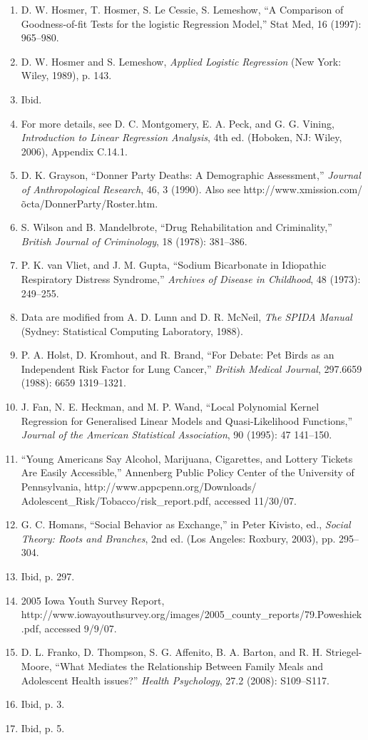 \documentclass[
]{report}
\begin{document}
\begin{enumerate}
\item D. W. Hosmer, T. Hosmer, S. Le Cessie, S. Lemeshow, “A Comparison of Goodness-of-fit Tests for the logistic Regression Model,” Stat Med, 16 (1997): 965–980.
\item D. W. Hosmer and S. Lemeshow, \textit{Applied Logistic Regression} (New York: Wiley, 1989), p. 143.
\item Ibid.
\item For more details, see D. C. Montgomery, E. A. Peck, and G. G. Vining, \textit{Introduction to Linear Regression Analysis}, 4th ed. (Hoboken, NJ: Wiley, 2006), Appendix C.14.1.
\item D. K. Grayson, “Donner Party Deaths: A Demographic Assessment,” \textit{Journal of Anthropological Research}, 46, 3 (1990). Also see http://www.xmission.com/\~octa/DonnerParty/Roster.htm.
\item S. Wilson and B. Mandelbrote, “Drug Rehabilitation and Criminality,” \textit{British Journal of Criminology}, 18 (1978): 381–386.
\item P. K. van Vliet, and J. M. Gupta, “Sodium Bicarbonate in Idiopathic Respiratory Distress Syndrome,” \textit{Archives of Disease in Childhood}, 48 (1973): 249–255.
\item Data are modified from A. D. Lunn and D. R. McNeil, \textit{The SPIDA Manual} (Sydney: Statistical Computing Laboratory, 1988).
\item P. A. Holst, D. Kromhout, and R. Brand, “For Debate: Pet Birds as an Independent Risk Factor for Lung Cancer,” \textit{British Medical Journal}, 297.6659 (1988): 6659 1319–1321.
\item J. Fan, N. E. Heckman, and M. P. Wand, “Local Polynomial Kernel Regression for Generalised Linear Models and Quasi-Likelihood Functions,” \textit{Journal of the American Statistical Association}, 90 (1995): 47 141–150.
\item “Young Americans Say Alcohol, Marijuana, Cigarettes, and Lottery Tickets Are Easily Accessible,” Annenberg Public Policy Center of the University of Pennsylvania, http://www.appcpenn.org/Downloads/
Adolescent\_Risk/Tobacco/risk\_report.pdf, accessed 11/30/07.
\item G. C. Homans, “Social Behavior as Exchange,” in Peter Kivisto, ed., \textit{Social Theory: Roots and Branches}, 2nd ed. (Los Angeles: Roxbury, 2003), pp. 295–304.
\item Ibid, p. 297.
\item 2005 Iowa Youth Survey Report, http://www.iowayouthsurvey.org/images/2005\_county\_reports/79.Poweshiek.pdf, accessed 9/9/07.
\item D. L. Franko, D. Thompson, S. G. Affenito, B. A. Barton, and R. H. Striegel-Moore, “What Mediates the Relationship Between Family Meals and Adolescent Health issues?” \textit{Health Psychology}, 27.2 (2008): S109–S117.
\item Ibid, p. 3.
\item Ibid, p. 5.

\end{enumerate}
\end{document}
